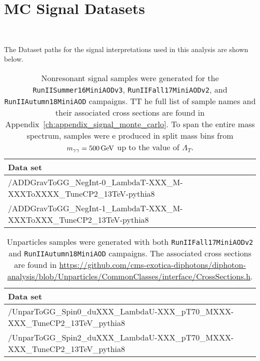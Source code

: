 \section{MC Signal Datasets}~\label{MCSignal}

The Dataset paths for the signal interpretations used in this analysis are shown below.

\begin{table}[!htbp]
  \caption{Nonresonant signal samples were generated for the \texttt{RunIISummer16MiniAODv3}, \texttt{RunIIFall17MiniAODv2}, and \texttt{RunIIAutumn18MiniAOD} campaigns. TT
he full list of sample names and their associated cross sections are found in Appendix~\ref{ch:appendix_signal_monte_carlo}. To span the entire mass spectrum, samples were
e produced in split mass bins from $m_{\gamma\gamma} = 500\,\text{Ge\hspace{-.08em}V}$ up to the value of $\Lambda_T$.
}
  \centering
  \vspace{\baselineskip}
  \begin{tabular}{lc}
  \hline \hline
  Data set\\
  \hline
  /ADDGravToGG\_NegInt-0\_LambdaT-XXX\_M-XXXToXXXX\_TuneCP2\_13TeV-pythia8 \\
  /ADDGravToGG\_NegInt-1\_LambdaT-XXX\_M-XXXToXXX\_TuneCP2\_13TeV-pythia8 \\
  \hline \hline
  \end{tabular}
  \label{table:ADDsamples}
\end{table}

\begin{table}[!htbp]
	\caption{Unparticles samples were generated with both \texttt{RunIIFall17MiniAODv2} and \texttt{RunIIAutumn18MiniAOD} campaigns. The associated cross sections are found in \url{https://github.com/cms-exotica-diphotons/diphoton-analysis/blob/Unparticles/CommonClasses/interface/CrossSections.h}.
}
	\centering
	\vspace{\baselineskip}
	\begin{tabular}{lc}
	\hline \hline
	Data set\\
	\hline
	/UnparToGG\_Spin0\_duXXX\_LambdaU-XXX\_pT70\_MXXX-XXX\_TuneCP2\_13TeV\_pythia8 \\
	/UnparToGG\_Spin2\_duXXX\_LambdaU-XXX\_pT70\_MXXX-XXX\_TuneCP2\_13TeV\_pythia8 \\
	\hline \hline
	\end{tabular}
	\label{table:UnparticlesSamples}
\end{table}